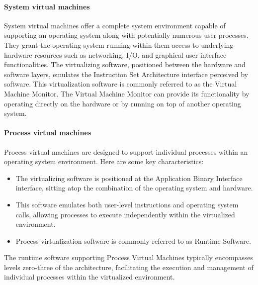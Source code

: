 \paragraph*{System virtual machines}
System virtual machines offer a complete system environment capable of supporting an operating system along with potentially numerous user processes. 
They grant the operating system running within them access to underlying hardware resources such as networking, I/O, and graphical user interface functionalities.
The virtualizing software, positioned between the hardware and software layers, emulates the Instruction Set Architecture interface perceived by software. 
This virtualization software is commonly referred to as the Virtual Machine Monitor.
The Virtual Machine Monitor can provide its functionality by operating directly on the hardware or by running on top of another operating system.

\paragraph*{Process virtual machines}
Process virtual machines are designed to support individual processes within an operating system environment. 
Here are some key characteristics:
\begin{itemize}
    \item The virtualizing software is positioned at the Application Binary Interface interface, sitting atop the combination of the operating system and hardware.
    \item This software emulates both user-level instructions and operating system calls, allowing processes to execute independently within the virtualized environment.
    \item Process virtualization software is commonly referred to as Runtime Software.
\end{itemize}
The runtime software supporting Process Virtual Machines typically encompasses levels zero-three of the architecture, facilitating the execution and management of individual processes within the virtualized environment.

